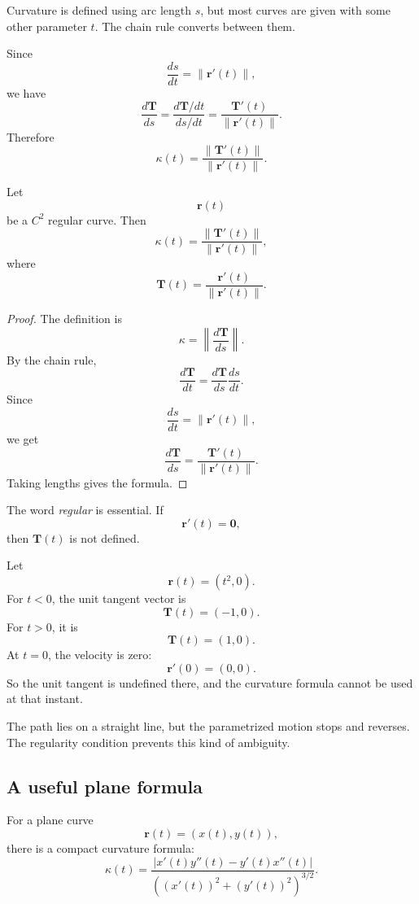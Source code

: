 Curvature is defined using arc length \(s\), but most curves are given with some other
parameter \(t\).  The chain rule converts between them.

Since
\[
    \frac{ds}{dt}=\|\mathbf r'(t)\|,
\]
we have
\[
    \frac{d\mathbf T}{ds}
    =
    \frac{d\mathbf T/dt}{ds/dt}
    =
    \frac{\mathbf T'(t)}{\|\mathbf r'(t)\|}.
\]
Therefore
\[
\boxed{
    \kappa(t)=\frac{\|\mathbf T'(t)\|}{\|\mathbf r'(t)\|}.
}
\]

\begin{theorem}
Let
\[
    \mathbf r(t)
\]
be a \(C^2\) regular curve.  Then
\[
\boxed{
    \kappa(t)=\frac{\|\mathbf T'(t)\|}{\|\mathbf r'(t)\|},
}
\]
where
\[
    \mathbf T(t)=\frac{\mathbf r'(t)}{\|\mathbf r'(t)\|}.
\]
\end{theorem}

\begin{proof}
The definition is
\[
    \kappa=\left\|\frac{d\mathbf T}{ds}\right\|.
\]
By the chain rule,
\[
    \frac{d\mathbf T}{dt}
    =
    \frac{d\mathbf T}{ds}\frac{ds}{dt}.
\]
Since
\[
    \frac{ds}{dt}=\|\mathbf r'(t)\|,
\]
we get
\[
    \frac{d\mathbf T}{ds}
    =
    \frac{\mathbf T'(t)}{\|\mathbf r'(t)\|}.
\]
Taking lengths gives the formula.
\end{proof}

The word \emph{regular} is essential.  If
\[
    \mathbf r'(t)=\mathbf 0,
\]
then \(\mathbf T(t)\) is not defined.

\begin{example}
Let
\[
    \mathbf r(t)=(t^2,0).
\]
For \(t<0\), the unit tangent vector is
\[
    \mathbf T(t)=(-1,0).
\]
For \(t>0\), it is
\[
    \mathbf T(t)=(1,0).
\]
At \(t=0\), the velocity is zero:
\[
    \mathbf r'(0)=(0,0).
\]
So the unit tangent is undefined there, and the curvature formula cannot be used at
that instant.

The path lies on a straight line, but the parametrized motion stops and reverses.
The regularity condition prevents this kind of ambiguity.
\end{example}

\subsection{A useful plane formula}

For a plane curve
\[
    \mathbf r(t)=(x(t),y(t)),
\]
there is a compact curvature formula:
\[
\boxed{
    \kappa(t)=
    \frac{|x'(t)y''(t)-y'(t)x''(t)|}
    {\left((x'(t))^2+(y'(t))^2\right)^{3/2}}.
}
\]


